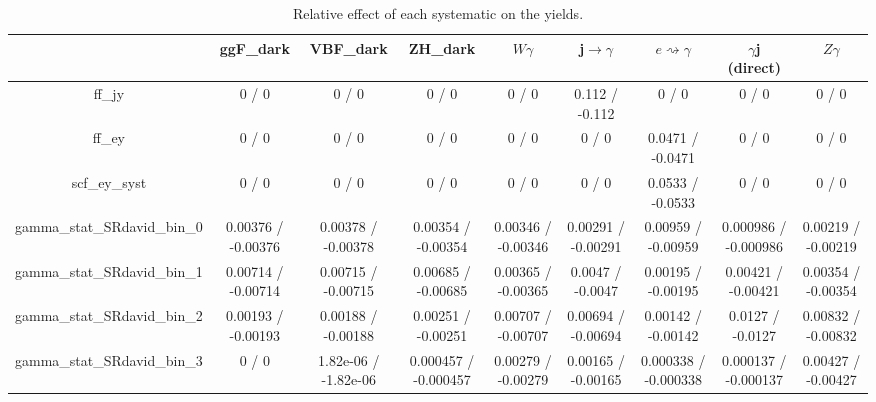 \documentclass[10pt]{article}
\begin{document}
\begin{table}[htbp]
\begin{center}
\begin{tabular}{|c|c|c|c|c|c|c|c|c|}
\hline 
      & ggF_{dark}      & VBF_{dark}      & ZH_{dark}      & $W\gamma$      & j$\rightarrow\gamma$      & $e\rightsquigarrow\gamma$      & $\gamma$j (direct)      & $Z\gamma$ \\ 
\hline 
  ff_jy & 0 / 0 & 0 / 0 & 0 / 0 & 0 / 0 & 0.112 / -0.112 & 0 / 0 & 0 / 0 & 0 / 0 \\ 
  ff_ey & 0 / 0 & 0 / 0 & 0 / 0 & 0 / 0 & 0 / 0 & 0.0471 / -0.0471 & 0 / 0 & 0 / 0 \\ 
  scf_ey_syst & 0 / 0 & 0 / 0 & 0 / 0 & 0 / 0 & 0 / 0 & 0.0533 / -0.0533 & 0 / 0 & 0 / 0 \\ 
  gamma_stat_SRdavid_bin_0 & 0.00376 / -0.00376 & 0.00378 / -0.00378 & 0.00354 / -0.00354 & 0.00346 / -0.00346 & 0.00291 / -0.00291 & 0.00959 / -0.00959 & 0.000986 / -0.000986 & 0.00219 / -0.00219 \\ 
  gamma_stat_SRdavid_bin_1 & 0.00714 / -0.00714 & 0.00715 / -0.00715 & 0.00685 / -0.00685 & 0.00365 / -0.00365 & 0.0047 / -0.0047 & 0.00195 / -0.00195 & 0.00421 / -0.00421 & 0.00354 / -0.00354 \\ 
  gamma_stat_SRdavid_bin_2 & 0.00193 / -0.00193 & 0.00188 / -0.00188 & 0.00251 / -0.00251 & 0.00707 / -0.00707 & 0.00694 / -0.00694 & 0.00142 / -0.00142 & 0.0127 / -0.0127 & 0.00832 / -0.00832 \\ 
  gamma_stat_SRdavid_bin_3 & 0 / 0 & 1.82e-06 / -1.82e-06 & 0.000457 / -0.000457 & 0.00279 / -0.00279 & 0.00165 / -0.00165 & 0.000338 / -0.000338 & 0.000137 / -0.000137 & 0.00427 / -0.00427 \\ 
\hline 
\end{tabular} 
\caption{Relative effect of each systematic on the yields.} 
\end{center} 
\end{table} 
\end{document}
